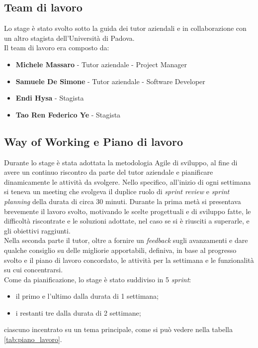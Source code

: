 \subsection{Team di lavoro}
Lo stage è stato svolto sotto la guida dei tutor aziendali e in collaborazione con un altro stagista dell'Università di Padova. \\
Il team di lavoro era composto da:
\begin{itemize}
    \item \textbf{Michele Massaro} - Tutor aziendale - Project Manager
    \item \textbf{Samuele De Simone} - Tutor aziendale - Software Developer
    \item \textbf{Endi Hysa} - Stagista
    \item \textbf{Tao Ren Federico Ye} - Stagista
\end{itemize}


\subsection{Way of Working e Piano di lavoro}
Durante lo stage è stata adottata la metodologia Agile di sviluppo, al fine di avere un 
continuo riscontro da parte del tutor aziendale e pianificare dinamicamente le attività da 
svolgere. Nello specifico, all'inizio di ogni settimana si teneva un meeting che svolgeva 
il duplice ruolo di \textit{sprint review} e \textit{sprint planning} della durata di 
circa 30 minuti. Durante la prima metà si presentava brevemente il lavoro svolto, 
motivando le scelte progettuali e di sviluppo fatte, le difficoltà riscontrate e le 
soluzioni adottate, nel caso se si è riusciti a superarle, e gli obiettivi raggiunti.\\ 
Nella seconda parte il tutor, oltre a fornire un \textit{feedback} sugli avanzamenti e 
dare qualche consiglio su delle migliorie apportabili, definiva, in base al progresso 
svolto e il piano di lavoro concordato, le attività per la settimana e le funzionalità su 
cui concentrarsi.\\
Come da pianificazione, lo stage è stato suddiviso in 5 \textit{sprint}:
\begin{itemize}
    \item il primo e l'ultimo dalla durata di 1 settimana;
    \item i restanti tre dalla durata di 2 settimane;
\end{itemize}
ciascuno incentrato su un tema principale, come si può vedere nella tabella \ref{tab:piano_lavoro}.

